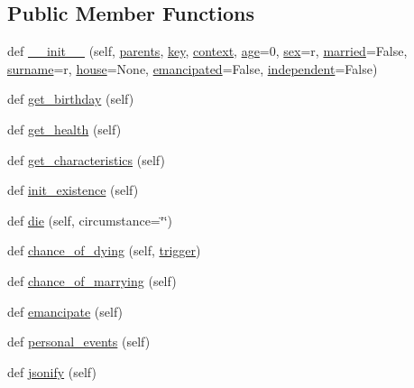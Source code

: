 \subsection*{Public Member Functions}
\begin{DoxyCompactItemize}
\item 
def \hyperlink{classclasses_1_1person_1_1Person_a3eef6f1acc8948383b7fe10d6a505f44}{\+\_\+\+\_\+init\+\_\+\+\_\+} (self, \hyperlink{classclasses_1_1person_1_1Person_a8598294e27c3c5cb008e84f7ef0be7fd}{parents}, \hyperlink{classclasses_1_1person_1_1Person_adb28f7f7c2dc88d43a64675529bb4119}{key}, \hyperlink{classclasses_1_1person_1_1Person_a8b821b66c4200dcb6f9975d7f6f9612a}{context}, \hyperlink{classclasses_1_1person_1_1Person_af911ef17491efdfc9122b6786d8f79fe}{age}=0, \hyperlink{classclasses_1_1person_1_1Person_a8e0e00739ec694ce3c0a05370c99c6fb}{sex}=\textquotesingle{}r\textquotesingle{}, \hyperlink{classclasses_1_1person_1_1Person_aa0a4bdc8f237587f8d363741bca6fdfa}{married}=False, \hyperlink{classclasses_1_1person_1_1Person_a0c30879d941c9d4fa33ee4ce8244d9e8}{surname}=\textquotesingle{}r\textquotesingle{}, \hyperlink{classclasses_1_1person_1_1Person_a4d04cfaff0ebd8eb0b0d8fdec147b880}{house}=None, \hyperlink{classclasses_1_1person_1_1Person_aff7f6f99ca2f0d8d8286fff2e28827c8}{emancipated}=False, \hyperlink{classclasses_1_1person_1_1Person_a26e0be4c923f1619ffcab5b2b38db13d}{independent}=False)
\item 
def \hyperlink{classclasses_1_1person_1_1Person_a2932d29dbf7dade28bb9252d01e2d88b}{get\+\_\+birthday} (self)
\item 
def \hyperlink{classclasses_1_1person_1_1Person_a781ead6b2924446239f3e6f780875cea}{get\+\_\+health} (self)
\item 
def \hyperlink{classclasses_1_1person_1_1Person_a1e45b5ce7d01dd64044543bde368655f}{get\+\_\+characteristics} (self)
\item 
def \hyperlink{classclasses_1_1person_1_1Person_a24de7c0efff06bba2efeb91a08647711}{init\+\_\+existence} (self)
\item 
def \hyperlink{classclasses_1_1person_1_1Person_a15db358f6a589eb98d6d00ce69ae9603}{die} (self, circumstance=\char`\"{}\char`\"{})
\item 
def \hyperlink{classclasses_1_1person_1_1Person_aad71d549fbaa9cd3a1e3fa0e14ee093d}{chance\+\_\+of\+\_\+dying} (self, \hyperlink{classclasses_1_1person_1_1Person_a332b1802c61834e52a330635d83bd65b}{trigger})
\item 
def \hyperlink{classclasses_1_1person_1_1Person_a725c3588b6d4b079ececef7a19f5895b}{chance\+\_\+of\+\_\+marrying} (self)
\item 
def \hyperlink{classclasses_1_1person_1_1Person_a9dd86d7333f4873797e1e27ead8dece8}{emancipate} (self)
\item 
def \hyperlink{classclasses_1_1person_1_1Person_a43b864d2572684af1095c4123e68fa7e}{personal\+\_\+events} (self)
\item 
def \hyperlink{classclasses_1_1person_1_1Person_a3858cfd69e58c1831b28bfb038bae571}{jsonify} (self)
\end{DoxyCompactItemize}
